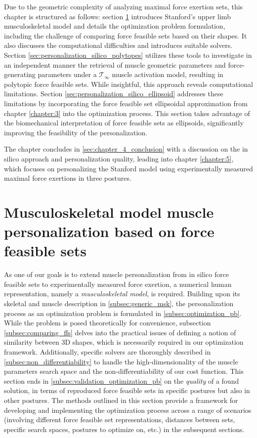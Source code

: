 Due to the geometric complexity of analyzing maximal force exertion sets, this chapter is structured as follows: section \ref{sec:musculoskeletal_model_muscle_pers_sec} introduces Stanford's upper limb musculoskeletal model and details the optimization problem formulation, including the challenge of comparing force feasible sets based on their shapes. It also discusses the computational difficulties and introduces suitable solvers. Section \ref{sec:personalization_silico_polytopes} utilizes these tools to investigate in an independent manner the retrieval of muscle geometric parameters and force-generating parameters under a $\mathcal{T}_{\infty}$ muscle activation model, resulting in polytopic force feasible sets. While insightful, this approach reveals computational limitations. Section \ref{sec:personalization_silico_ellipsoid} addresses these limitations by incorporating the force feasible set ellipsoidal approximation from chapter \ref{chapter:3} into the optimization process. This section takes advantage of the biomechanical interpretation of force feasible sets as ellipsoids, significantly improving the feasibility of the personalization.

The chapter concludes in \ref{sec:chapter_4_conclusion} with a discussion on the in silico approach and personalization quality, leading into chapter \ref{chapter:5}, which focuses on personalizing the Stanford model using experimentally measured maximal force exertions in three postures.

\section{Musculoskeletal model muscle personalization based on force feasible sets}
\label{sec:musculoskeletal_model_muscle_pers_sec}

As one of our goals is to extend muscle personalization from in silico force feasible sets to experimentally measured force exertion, a numerical human representation, namely a \emph{musculoskeletal model}, is required. Building upon its skeletal and muscle description in \ref{subsec:generic_msk}, the personalization process as an optimization problem is formulated in \ref{subsec:optimization_pb}. While the problem is posed theoretically for convenience, subsection \ref{subsec:comparing_ffs} delves into the practical issues of defining a notion of similarity between 3D shapes, which is necessarily required in our optimization framework. Additionally, specific solvers are thoroughly described in \ref{subsec:non_differentiability} to handle the high-dimensionality of the muscle parameters search space and the non-differentiability of our cost function. This section ends in \ref{subsec:validation_optimization_pb} on the \emph{quality} of a found solution, in terms of reproduced force feasible sets in specific postures but also in other postures. The methods outlined in this section provide a framework for developing and implementing the optimization process across a range of scenarios (involving different force feasible set representations, distances between sets, specific search spaces, postures to optimize on, etc.) in the subsequent sections.

